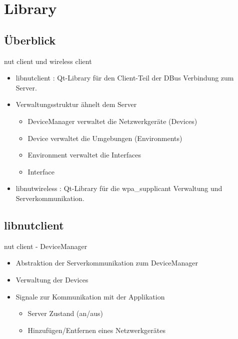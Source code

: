 
\section{Library}
\subsection{Überblick}
\begin{frame}[<+-| alert@+>]{nut client und wireless client}
	\begin{itemize}
		\item libnutclient : Qt-Library für den Client-Teil der DBus Verbindung zum Server.
		\item Verwaltungsstruktur ähnelt dem Server
		\begin{itemize}
			\item DeviceManager verwaltet die Netzwerkgeräte (Devices)
			\item Device verwaltet die Umgebungen (Environments)
			\item Environment verwaltet die Interfaces
			\item Interface
		\end{itemize}

		\item libnutwireless : Qt-Library für die wpa\_supplicant Verwaltung und Serverkommunikation.
	\end{itemize}
\end{frame}

\subsection{libnutclient}
\begin{frame}[<+-| alert@+>]{nut client - DeviceManager}
	\begin{itemize}
		\item Abstraktion der Serverkommunikation zum DeviceManager
		\item Verwaltung der Devices
		\item Signale zur Kommunikation mit der Applikation
		\begin{itemize}
			\item Server Zustand (an/aus)
			\item Hinzufügen/Entfernen eines Netzwerkgerätes
		\end{itemize}
	\end{itemize}
\end{frame}

